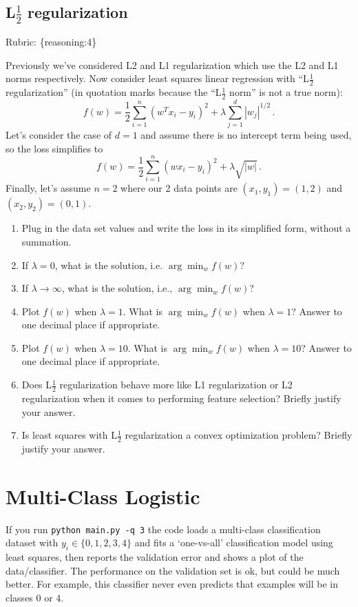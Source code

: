 \documentclass{article}
\def\rubric#1{\gre{Rubric: \{#1\}}}{}
\def\gre#1{{\color{gre}#1}}
\begin{document}
\subsection{L$\frac12$ regularization}
\rubric{reasoning:4}

Previously we've considered L2 and L1 regularization which use the L2 and L1 norms respectively. Now consider
least squares linear regression with ``L$\frac12$ regularization'' (in quotation marks because the ``L$\frac12$ norm'' is not a true norm):
\[
f(w) = \frac{1}{2} \sum_{i=1}^n (w^Tx_i - y_i)^2 + \lambda \sum_{j=1}^d |w_j|^{1/2} \, .
\]
Let's consider the case of $d=1$ and
assume  there is no intercept term being used, so the loss simplifies to
\[
f(w) = \frac{1}{2} \sum_{i=1}^n (wx_i - y_i)^2 + \lambda \sqrt{|w|} \, .
\]
Finally, let's assume $n=2$
where our 2 data points are $(x_1,y_1)=(1,2)$ and $(x_2,y_2)=(0,1)$. 

\begin{enumerate}
\item Plug in the data set values and write the loss in its simplified form, without a summation.
\item If $\lambda=0$, what is the solution, i.e. $\arg \min_w f(w)$?
\item If $\lambda\rightarrow \infty$, what is the solution, i.e., $\arg \min_w f(w)$?
\item Plot $f(w)$ when $\lambda = 1$. What is $\arg \min_w f(w)$ when $\lambda=1$? Answer to one decimal place if appropriate.
\item Plot $f(w)$ when $\lambda = 10$. What is $\arg \min_w f(w)$ when $\lambda=10$? Answer to one decimal place if appropriate.
\item Does L$\frac12$ regularization behave more like L1 regularization or L2 regularization
when it comes to performing feature selection? Briefly justify your answer.
\item Is least squares with L$\frac12$ regularization 
a convex optimization problem? Briefly justify your answer.
\end{enumerate}





\section{Multi-Class Logistic}

If you run \verb|python main.py -q 3| the code loads a multi-class
classification dataset with $y_i \in \{0,1,2,3,4\}$ and fits a `one-vs-all' classification
model using least squares, then reports the validation error and shows a plot of the data/classifier.
The performance on the validation set is ok, but could be much better.
For example, this classifier never even predicts that examples will be in classes 0 or 4.
\end{document}

